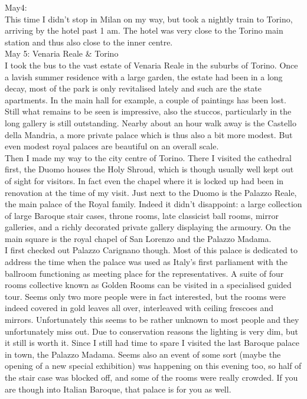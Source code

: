 May4:\\
This time I didn't stop in Milan on my way, but took a nightly train to Torino, arriving by the hotel past 1 am. The hotel was very close to the Torino main station and thus also close to the inner centre.\\

May 5: Venaria Reale \& Torino\\
I took the bus to the vast estate of Venaria Reale in the suburbs of Torino. Once a lavish summer residence with a large garden, the estate had been in a long decay, most of the park is only revitalised lately and such are the state apartments. In the main hall for example, a couple of paintings has been lost. Still what remains to be seen is impressive, also the stuccos, particularly in the long gallery is still outstanding. Nearby about an hour walk away is the Castello della Mandria, a more private palace which is thus also a bit more modest. But even modest royal palaces are beautiful on an overall scale.\\
Then I made my way to the city centre of Torino. There I visited the cathedral first, the Duomo houses the Holy Shroud, which is though usually well kept out of sight for visitors. In fact even the chapel where it is locked up had been in renovation at the time of my visit. Just next to the Duomo is the Palazzo Reale, the main palace of the Royal family. Indeed it didn't disappoint: a large collection of large Baroque stair cases, throne rooms, late classicist ball rooms, mirror galleries, and a richly decorated private gallery displaying the armoury. On the main square is the royal chapel of San Lorenzo and the Palazzo Madama.\\
I first checked out Palazzo Carignano though. Most of this palace is dedicated to address the time when the palace was used as Italy's first parliament with the ballroom functioning as meeting place for the representatives. A suite of four rooms collective known as Golden Rooms can be visited in a specialised guided tour. Seems only two more people were in fact interested, but the rooms were indeed covered in gold leaves all over, interleaved with ceiling frescoes and mirrors. Unfortunately this seems to be rather unknown to most people and they unfortunately miss out. Due to conservation reasons the lighting is very dim, but it still is worth it. Since I still had time to spare I visited the last Baroque palace in town, the Palazzo Madama. Seems also an event of some sort (maybe the opening of a new special exhibition) was happening on this evening too, so half of the stair case was blocked off, and some of the rooms were really crowded. If you are though into Italian Baroque, that palace is for you as well.\\

